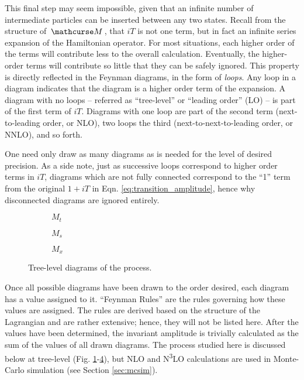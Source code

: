     This final step may seem impossible, given that an infinite number of intermediate particles can be inserted between any two states.
    Recall from the structure of $\invAmp$, that $iT$ is not one term, but in fact an infinite series expansion of the Hamiltonian operator.
    For most situations, each higher order of the terms will contribute less to the overall calculation.
    Eventually, the higher-order terms will contribute so little that they can be safely ignored.
    This property is directly reflected in the Feynman diagrams, in the form of \textit{loops}.
    Any loop in a diagram indicates that the diagram is a higher order term of the expansion.
    A diagram with no loops -- referred as ``tree-level'' or ``leading order'' (LO) -- is part of the first term of $iT$.
    Diagrams with one loop are part of the second term (next-to-leading order, or NLO),
        two loops the third (next-to-next-to-leading order, or NNLO), and so forth.

    One need only draw as many diagrams as is needed for the level of desired precision.
    As a side note, just as successive loops correspond to higher order terms in $iT$,
        diagrams which are not fully connected correspond to the ``1'' term from the original $1+iT$ in Eqn. \ref{eq:transition_amplitude},
        hence why disconnected diagrams are ignored entirely.

    \begin{figure}
    \centering
    \begin{subfigure}{0.32\textwidth} 
         
        \caption{$M_t$}
        \label{fig:tree_level_vbfhh:kv}
    \end{subfigure}
    \begin{subfigure}{0.32\textwidth}
         
        \caption{$M_s$}
        \label{fig:tree_level_vbfhh:kl}
    \end{subfigure}
    \begin{subfigure}{0.32\textwidth}
         
        \caption{$M_x$}
        \label{fig:tree_level_vbfhh:k2v}
    \end{subfigure}
    \caption{Tree-level diagrams of the \hhproc process.}
    \end{figure}

    Once all possible diagrams have been drawn to the order desired, each diagram has a value assigned to it.
    ``Feynman Rules'' are the rules governing how these values are assigned.
    The rules are derived based on the structure of the Lagrangian and are rather extensive;
        hence, they will not be listed here.
    After the values have been determined, the invariant amplitude is trivially calculated as the sum of the values of all drawn diagrams.
    The \hhproc process studied here is discussed below at tree-level
        (Fig. \ref{fig:tree_level_vbfhh:kv}-\ref{fig:tree_level_vbfhh:k2v}),
        but NLO and N\textsuperscript{3}LO calculations are used in Monte-Carlo simulation (see Section \ref{sec:mcsim}).

